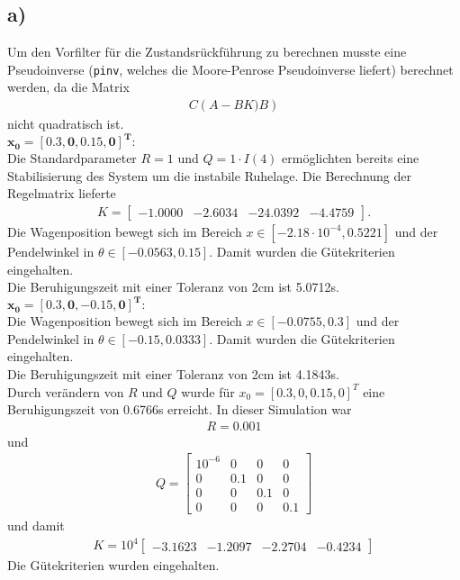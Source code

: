\documentclass[11pt]{scrartcl} %
\begin{document}
\subsection*{a)}
Um den Vorfilter für die Zustandsrückführung zu berechnen musste eine Pseudoinverse (\verb+pinv+, welches die Moore-Penrose Pseudoinverse liefert) berechnet werden, da die Matrix
\begin{align*}
C\left(A-BK)B\right)
\end{align*}
nicht quadratisch ist.\\

$\mathbf{x_0=\left[ 0.3, 0, 0.15, 0 \right]^T:}$\\

Die Standardparameter $R=1$ und $Q=1 \cdot \mathit{I}(4)$ ermöglichten bereits eine Stabilisierung des System um die instabile Ruhelage. Die Berechnung der Regelmatrix lieferte
\begin{align*}
K = \begin{bmatrix}
     -1.0000  & -2.6034 & -24.0392 &  -4.4759
\end{bmatrix}.
\end{align*}
Die Wagenposition bewegt sich im Bereich $x \in \left[-2.18\cdot 10^{-4}, 0.5221\right]$ und der Pendelwinkel in $\theta \in \left[-0.0563, 0.15\right]$. Damit wurden die Gütekriterien eingehalten.\\

Die Beruhigungszeit mit einer Toleranz von 2cm ist 5.0712s.\\

$\mathbf{x_0=\left[ 0.3, 0, -0.15, 0 \right]^T:}$\\

Die Wagenposition bewegt sich im Bereich $x \in \left[-0.0755, 0.3\right]$ und der Pendelwinkel in $\theta \in \left[-0.15, 0.0333\right]$. Damit wurden die Gütekriterien eingehalten.\\

Die Beruhigungszeit mit einer Toleranz von 2cm ist 4.1843s.\\

Durch verändern von $R$ und $Q$ wurde für $x_0=\left[ 0.3, 0, 0.15, 0 \right]^T$ eine Beruhigungszeit von 0.6766s erreicht. In dieser Simulation war
\begin{align*}
R = 0.001
\end{align*}
und
\begin{align*}
Q = \begin{bmatrix}
10^{-6} & 0 & 0 & 0 \\
0 & 0.1 & 0 & 0 \\
0 & 0 & 0.1 & 0 \\
0 & 0 & 0 & 0.1
\end{bmatrix}
\end{align*}
und damit
\begin{align*}
K =  10^4 \begin{bmatrix}
   -3.1623  & -1.2097  & -2.2704  & -0.4234
\end{bmatrix}
\end{align*}
Die Gütekriterien wurden eingehalten.\\
\end{document}
